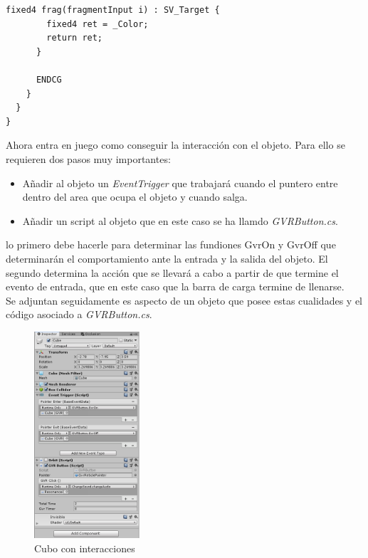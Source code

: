 \begin{lstlisting}[frame=single, caption={GvrReticleShader.shader}]
      fixed4 frag(fragmentInput i) : SV_Target {
        fixed4 ret = _Color;
        return ret;
      }

      ENDCG
    }
  }
}

\end{lstlisting}


\quad Ahora entra en juego como conseguir la interacción con el objeto. Para ello se requieren dos pasos muy importantes: \\

\begin{itemize}
	\item Añadir al objeto un \textit{EventTrigger} que trabajará cuando el puntero entre dentro del area que ocupa el objeto y cuando salga.
	\item Añadir un script al objeto que en este caso se ha llamdo \textit{GVRButton.cs}.
\end{itemize}

\quad lo primero debe hacerle para determinar las fundiones GvrOn y GvrOff que determinarán el comportamiento ante la entrada y la salida del objeto. El segundo determina la acción que se llevará a cabo a partir de que termine el evento de entrada, que en este caso que la barra de carga termine de llenarse.\\

\quad Se adjuntan seguidamente es aspecto de un objeto que posee estas cualidades y el código asociado a \textit{GVRButton.cs}.\\

\begin{figure}[htb]
	\centering
	\includegraphics[width=0.35\textwidth]{./imagenes/cube}
	\caption{Cubo con interacciones}
\end{figure} 

